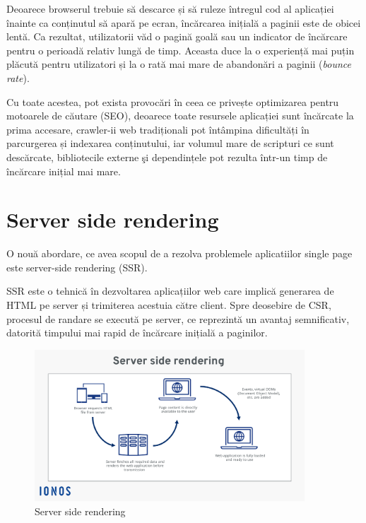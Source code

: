 \documentclass[12pt, a4paper]{report}
\begin{document}
Deoarece browserul trebuie să descarce și să ruleze întregul cod al aplicației înainte ca conținutul să apară pe ecran, încărcarea inițială a paginii este de obicei lentă. Ca rezultat, utilizatorii văd o pagină goală sau un indicator de încărcare pentru o perioadă relativ lungă de timp. Aceasta duce la o experiență mai puțin plăcută pentru utilizatori și la o rată mai mare de abandon\u ari a paginii (\textit{bounce rate}). \cite{google-bouncing-rate}

Cu toate acestea, pot exista provocări în ceea ce privește optimizarea pentru motoarele de căutare (SEO), deoarece toate resursele aplicației sunt \^inc\u arcate la prima accesare, crawler-ii web tradiționali pot întâmpina dificultăți în parcurgerea și indexarea conținutului, iar volumul mare de scripturi ce sunt descărcate, bibliotecile externe \c si dependințele pot rezulta \^intr-un timp de încărcare inițial mai mare.

\section{Server side rendering}

O nou\u a abordare, ce avea scopul de a rezolva problemele aplicatiilor single page este server-side rendering (SSR).

SSR este o tehnică în dezvoltarea aplicațiilor web care implică generarea de HTML pe server și trimiterea acestuia către client. Spre deosebire de CSR, procesul de randare se execut\u a pe server, ce reprezintă un avantaj semnificativ, datorită timpului mai rapid de încărcare inițială a paginilor. \cite{benefitsserverrendering}

\begin{figure}[htbp]
	\centering
	\includegraphics[width=0.9\textwidth]{ssr-diagram.png}
	\caption{Server side rendering}
	\label{fig:ssr-diagram}
\end{figure}
\end{document}
